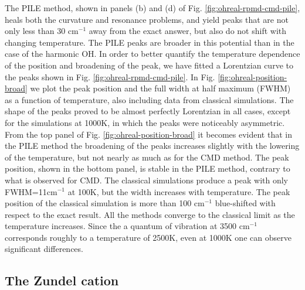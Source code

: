 \documentclass[aps,prb,superscriptaddress,amsmath,amssymb,showpacs,twocolumn]{revtex4}
\begin{document}
The PILE method, shown in panels (b) and (d) of Fig. \ref{fig:ohreal-rpmd-cmd-pile}, heals both the curvature 
and resonance problems, and yield peaks that are not only less than 30 cm$^{-1}$ away from the exact answer, but 
also do not shift with changing temperature. The PILE peaks are broader in this potential than
in the case of the harmonic OH. In order to better quantify the temperature dependence of the position 
and broadening of the peak, we have fitted a Lorentzian curve to the peaks shown in Fig. 
\ref{fig:ohreal-rpmd-cmd-pile}. 
In Fig. \ref{fig:ohreal-position-broad} we plot the peak position and the full 
width at half maximum (FWHM) as a function of temperature,
also including data from classical simulations.
The shape of the peaks proved to be almost perfectly Lorentzian in all cases,
except for the simulations at 1000K, in which the peaks were noticeably asymmetric.
From the top panel of Fig. \ref{fig:ohreal-position-broad} it becomes evident that 
in the PILE method the broadening of the peaks increases slightly with the lowering 
of the temperature, but not nearly as much as for the CMD method. 
The peak position, shown in the bottom panel, is stable in the PILE method, contrary to
what is observed for CMD. The classical simulations produce a peak
with only FWHM=11cm$^{-1}$ at 100K, but the width increases with temperature.
The peak position of the classical simulation is more than 100 cm$^{-1}$
blue-shifted with respect to the exact result.
All the methods converge to the classical limit as the temperature 
increases. Since the a quantum of vibration at 3500 cm$^{-1}$
corresponds roughly to a temperature of 2500K, even at 1000K one
can observe significant differences.


\subsection{The Zundel cation}
\end{document}
